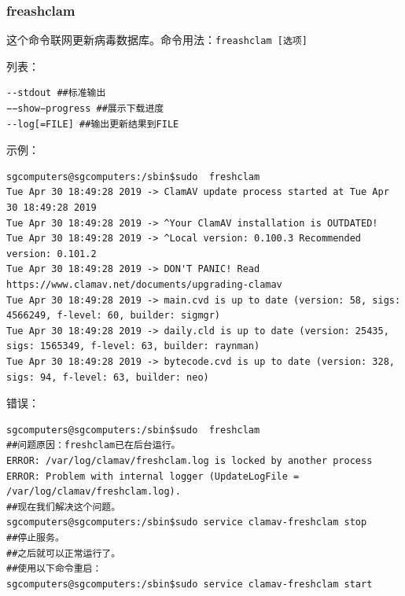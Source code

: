 \subsubsection{freashclam}
\cite{mancf}\par
这个命令联网更新病毒数据库。命令用法：\verb|freashclam [选项] |\par
[选项]列表：\par
\begin{verbatim}
--stdout ##标准输出
−−show−progress ##展示下载进度
--log[=FILE] ##输出更新结果到FILE
\end{verbatim} \par
示例：
\begin{verbatim}
sgcomputers@sgcomputers:/sbin$sudo  freshclam
Tue Apr 30 18:49:28 2019 -> ClamAV update process started at Tue Apr 30 18:49:28 2019
Tue Apr 30 18:49:28 2019 -> ^Your ClamAV installation is OUTDATED!
Tue Apr 30 18:49:28 2019 -> ^Local version: 0.100.3 Recommended version: 0.101.2
Tue Apr 30 18:49:28 2019 -> DON'T PANIC! Read https://www.clamav.net/documents/upgrading-clamav
Tue Apr 30 18:49:28 2019 -> main.cvd is up to date (version: 58, sigs: 4566249, f-level: 60, builder: sigmgr)
Tue Apr 30 18:49:28 2019 -> daily.cld is up to date (version: 25435, sigs: 1565349, f-level: 63, builder: raynman)
Tue Apr 30 18:49:28 2019 -> bytecode.cvd is up to date (version: 328, sigs: 94, f-level: 63, builder: neo)
\end{verbatim} \par
错误：
\begin{verbatim}
sgcomputers@sgcomputers:/sbin$sudo  freshclam
##问题原因：freshclam已在后台运行。
ERROR: /var/log/clamav/freshclam.log is locked by another process
ERROR: Problem with internal logger (UpdateLogFile = /var/log/clamav/freshclam.log).
##现在我们解决这个问题。
sgcomputers@sgcomputers:/sbin$sudo service clamav-freshclam stop
##停止服务。
##之后就可以正常运行了。
##使用以下命令重启：
sgcomputers@sgcomputers:/sbin$sudo service clamav-freshclam start
\end{verbatim}
